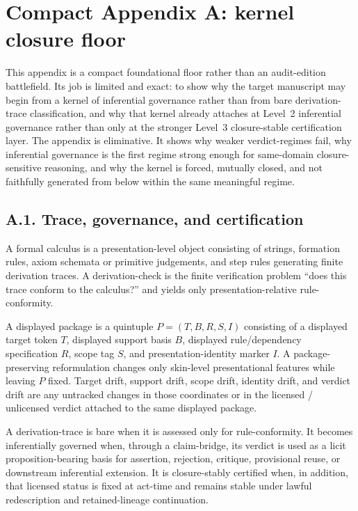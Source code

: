 \section{Compact Appendix A: kernel closure floor}
\label{app:compactA}

This appendix is a compact foundational floor rather than an audit-edition battlefield. Its job is limited and exact: to show why the target manuscript may begin from a kernel of inferential governance rather than from bare derivation-trace classification, and why that kernel already attaches at Level~2 inferential governance rather than only at the stronger Level~3 closure-stable certification layer. The appendix is eliminative. It shows why weaker verdict-regimes fail, why inferential governance is the first regime strong enough for same-domain closure-sensitive reasoning, and why the kernel is forced, mutually closed, and not faithfully generated from below within the same meaningful regime.

\subsection*{A.1. Trace, governance, and certification}

\begin{definition}
A formal calculus is a presentation-level object consisting of strings, formation rules, axiom schemata or primitive judgements, and step rules generating finite derivation traces. A derivation-check is the finite verification problem ``does this trace conform to the calculus?'' and yields only presentation-relative rule-conformity.
\end{definition}

\begin{definition}
A displayed package is a quintuple $P=(T,B,R,S,I)$ consisting of a displayed target token $T$, displayed support basis $B$, displayed rule/dependency specification $R$, scope tag $S$, and presentation-identity marker $I$. A package-preserving reformulation changes only skin-level presentational features while leaving $P$ fixed. Target drift, support drift, scope drift, identity drift, and verdict drift are any untracked changes in those coordinates or in the licensed / unlicensed verdict attached to the same displayed package.
\end{definition}

\begin{definition}
A derivation-trace is bare when it is assessed only for rule-conformity. It becomes inferentially governed when, through a claim-bridge, its verdict is used as a licit proposition-bearing basis for assertion, rejection, critique, provisional reuse, or downstream inferential extension. It is closure-stably certified when, in addition, that licensed status is fixed at act-time and remains stable under lawful redescription and retained-lineage continuation.
\end{definition}

